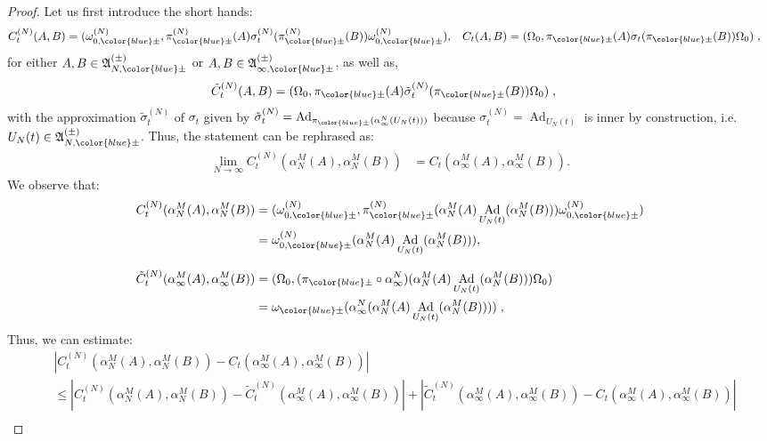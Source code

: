 \documentclass[a4paper, 11pt]{article}
\newcommand{\fA}{\mathfrak{A}}\newcommand{\cA}{\mathcal{A}}\newcommand{\dA}{\mathds{A}}\newcommand{\sA}{\mathscr{A}}
\DeclareMathOperator{\Ad}{Ad}
\DeclareMathOperator{\1}{\mathds{1}}
\begin{document}
\begin{proof}
Let us first introduce the short hands:
\begin{align*}
C^{(N)}_{t}(A,B) & = (\omega^{(N)}_{0,{\color{blue}\pm}},\pi^{(N)}_{{\color{blue}\pm}}(A)\sigma^{(N)}_{t}(\pi^{(N)}_{{\color{blue}\pm}}(B))\omega^{(N)}_{0,{\color{blue}\pm}}), & C_{t}(A,B) & = (\Omega_{0},\pi_{{\color{blue}\pm}}(A)\sigma_{t}(\pi_{{\color{blue}\pm}}(B))\Omega_{0})\;,
\end{align*}
for either $A,B\in\fA^{(\pm)}_{N,{\color{blue}\pm}}$ or $A,B\in\fA^{(\pm)}_{\infty,{\color{blue}\pm}}$, as well as,
\begin{align*}
\tilde{C}^{(N)}_{t}(A,B) & = (\Omega_{0},\pi_{{\color{blue}\pm}}(A)\tilde{\sigma}^{(N)}_{t}(\pi_{{\color{blue}\pm}}(B))\Omega_{0})\;,
\end{align*}
with the approximation $\tilde{\sigma}^{(N)}_{t}$ of $\sigma_{t}$ given by $\tilde{\sigma}^{(N)}_{t} = \Ad_{\pi_{{\color{blue}\pm}}(\alpha^{N}_{\infty}(U_{N}(t)))}$ because $\sigma^{(N)}_{t} = \Ad_{U_{N}(t)}$ is inner by construction, i.e.~$U_{N}(t)\in\fA^{(\pm)}_{N,{\color{blue}\pm}}$. Thus, the statement can be rephrased as:
\begin{align*}
\lim_{N\rightarrow\infty}C^{(N)}_{t}(\alpha^{M}_{N}(A),\alpha^{M}_{N}(B)) & = C_{t}(\alpha^{M}_{\infty}(A),\alpha^{M}_{\infty}(B)).
\end{align*}
We observe that:
\begin{align}
\label{eq:algcor}
C^{(N)}_{t}(\alpha^{M}_{N}(A),\alpha^{M}_{N}(B)) & = (\omega^{(N)}_{0,{\color{blue}\pm}},\pi^{(N)}_{{\color{blue}\pm}}(\alpha^{M}_{N}(A)\Ad_{U_{N}(t)}(\alpha^{M}_{N}(B)))\omega^{(N)}_{0,{\color{blue}\pm}}) \\ \nonumber
 & = \omega^{(N)}_{0,{\color{blue}\pm}}(\alpha^{M}_{N}(A)\Ad_{U_{N}(t)}(\alpha^{M}_{N}(B))), \\[0.25cm] \nonumber
\tilde{C}^{(N)}_{t}(\alpha^{M}_{\infty}(A),\alpha^{M}_{\infty}(B))  & = (\Omega_{0},(\pi_{{\color{blue}\pm}}\circ\alpha^{N}_{\infty})(\alpha^{M}_{N}(A)\Ad_{U_{N}(t)}(\alpha^{M}_{N}(B)))\Omega_{0}) \\ \nonumber
 & = \omega_{{\color{blue}\pm}}(\alpha^{N}_{\infty}(\alpha^{M}_{N}(A)\Ad_{U_{N}(t)}(\alpha^{M}_{N}(B))))\;,
\end{align}
Thus, we  can estimate:
\begin{align*}
 & |C^{(N)}_{t}\!(\alpha^{M}_{N}\!(A),\alpha^{M}_{N}\!(B)\!)\!-\!C_{t}(\alpha^{M}_{\infty}\!(A),\alpha^{M}_{\infty}\!(B)\!)| \\
 &\!\leq\!|C^{(N)}_{t}\!(\alpha^{M}_{N}\!(A),\alpha^{M}_{N}\!(B)\!)\!-\!\tilde{C}^{(N)}_{t}\!(\alpha^{M}_{\infty}\!(A),\alpha^{M}_{\infty}\!(B)\!)|\!+\!|\tilde{C}^{(N)}_{t}\!(\alpha^{M}_{\infty}\!(A),\alpha^{M}_{\infty}\!(B)\!)\!-\!C_{t}(\alpha^{M}_{\infty}\!(A),\alpha^{M}_{\infty}\!(B)\!)| \\

\end{align*}
\end{proof}
\end{document}
